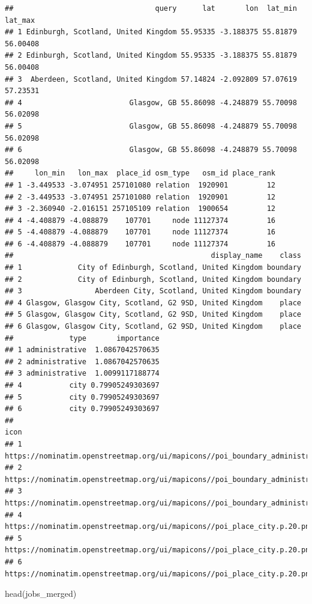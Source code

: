 \documentclass[
]{article}
\newenvironment{Shaded}{\begin{snugshade}}{\end{snugshade}}
\newcommand{\KeywordTok}[1]{\textcolor[rgb]{0.94,0.87,0.69}{#1}}
\newcommand{\NormalTok}[1]{\textcolor[rgb]{0.80,0.80,0.80}{#1}}
\begin{document}
\begin{verbatim}
##                                 query      lat       lon  lat_min  lat_max
## 1 Edinburgh, Scotland, United Kingdom 55.95335 -3.188375 55.81879 56.00408
## 2 Edinburgh, Scotland, United Kingdom 55.95335 -3.188375 55.81879 56.00408
## 3  Aberdeen, Scotland, United Kingdom 57.14824 -2.092809 57.07619 57.23531
## 4                         Glasgow, GB 55.86098 -4.248879 55.70098 56.02098
## 5                         Glasgow, GB 55.86098 -4.248879 55.70098 56.02098
## 6                         Glasgow, GB 55.86098 -4.248879 55.70098 56.02098
##     lon_min   lon_max  place_id osm_type   osm_id place_rank
## 1 -3.449533 -3.074951 257101080 relation  1920901         12
## 2 -3.449533 -3.074951 257101080 relation  1920901         12
## 3 -2.360940 -2.016151 257105109 relation  1900654         12
## 4 -4.408879 -4.088879    107701     node 11127374         16
## 5 -4.408879 -4.088879    107701     node 11127374         16
## 6 -4.408879 -4.088879    107701     node 11127374         16
##                                              display_name    class
## 1             City of Edinburgh, Scotland, United Kingdom boundary
## 2             City of Edinburgh, Scotland, United Kingdom boundary
## 3                 Aberdeen City, Scotland, United Kingdom boundary
## 4 Glasgow, Glasgow City, Scotland, G2 9SD, United Kingdom    place
## 5 Glasgow, Glasgow City, Scotland, G2 9SD, United Kingdom    place
## 6 Glasgow, Glasgow City, Scotland, G2 9SD, United Kingdom    place
##             type       importance
## 1 administrative  1.0867042570635
## 2 administrative  1.0867042570635
## 3 administrative  1.0099117188774
## 4           city 0.79905249303697
## 5           city 0.79905249303697
## 6           city 0.79905249303697
##                                                                                    icon
## 1 https://nominatim.openstreetmap.org/ui/mapicons//poi_boundary_administrative.p.20.png
## 2 https://nominatim.openstreetmap.org/ui/mapicons//poi_boundary_administrative.p.20.png
## 3 https://nominatim.openstreetmap.org/ui/mapicons//poi_boundary_administrative.p.20.png
## 4              https://nominatim.openstreetmap.org/ui/mapicons//poi_place_city.p.20.png
## 5              https://nominatim.openstreetmap.org/ui/mapicons//poi_place_city.p.20.png
## 6              https://nominatim.openstreetmap.org/ui/mapicons//poi_place_city.p.20.png
\end{verbatim}

\begin{Shaded}
\begin{Highlighting}[]
\KeywordTok{head}\NormalTok{(jobs\_merged)}
\end{Highlighting}
\end{Shaded}
\end{document}
